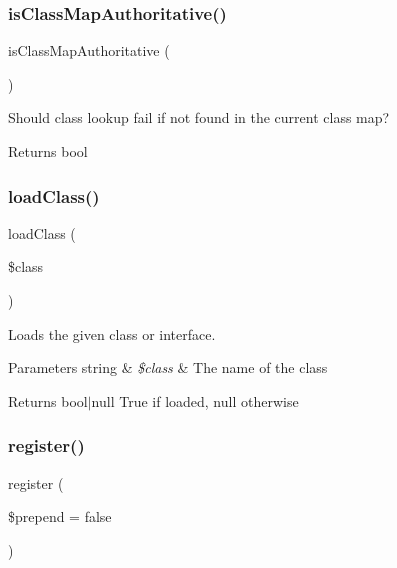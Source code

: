 \subsubsection{\texorpdfstring{is\+Class\+Map\+Authoritative()}{isClassMapAuthoritative()}}
{\footnotesize\ttfamily is\+Class\+Map\+Authoritative (\begin{DoxyParamCaption}{ }\end{DoxyParamCaption})}

Should class lookup fail if not found in the current class map?

\begin{DoxyReturn}{Returns}
bool 
\end{DoxyReturn}
\mbox{\label{class_composer_1_1_autoload_1_1_class_loader_a8326a997d0cfe76d80196f60d240d144}} 
\subsubsection{\texorpdfstring{load\+Class()}{loadClass()}}
{\footnotesize\ttfamily load\+Class (\begin{DoxyParamCaption}\item[{}]{\$class }\end{DoxyParamCaption})}

Loads the given class or interface.


\begin{DoxyParams}[1]{Parameters}
string & {\em \$class} & The name of the class \\
\hline
\end{DoxyParams}
\begin{DoxyReturn}{Returns}
bool$\vert$null True if loaded, null otherwise 
\end{DoxyReturn}
\mbox{\label{class_composer_1_1_autoload_1_1_class_loader_a3968965f178f6a5ef212b31b72231e69}} 
\subsubsection{\texorpdfstring{register()}{register()}}
{\footnotesize\ttfamily register (\begin{DoxyParamCaption}\item[{}]{\$prepend = {\ttfamily false} }\end{DoxyParamCaption})}

